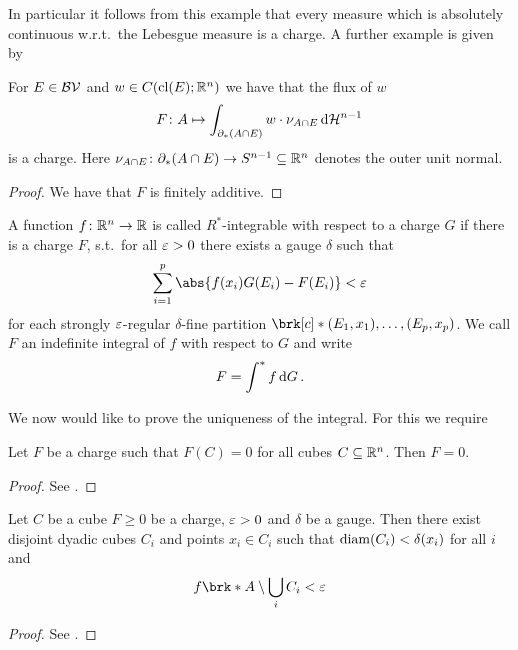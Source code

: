 In particular it follows from this example that every measure which is absolutely continuous w.r.t.\ the Lebesgue measure is a charge.
A further example is given by

\begin{claim}
For $E\in\mathcal{BV}$  and $w\in C(\operatorname{cl}(E);\mathbb{R}^n)$ we have that the flux of $w$
\begin{align*}
	F\colon A\mapsto \int_{\partial_*(A\cap E)}w\cdot\nu_{A\cap E}\,\mathrm{d} \mathcal{H}^{n-1}
\end{align*}
is a charge. Here $\nu_{A\cap E}\colon \partial_*(A\cap E)\to S^{n-1}\subseteq\mathbb{R}^n$ denotes the outer unit normal.
\end{claim}
\begin{proof}
We have that $F$ is finitely additive. 
\end{proof}

\begin{definition}
A function $f\colon \mathbb{R}^n\to\mathbb{R}$ is called $R^*$-integrable with respect to a charge $G$ if there is a charge $F$, s.t.\ for all $\varepsilon>0$ there exists a gauge $\delta$ such that
\begin{align*}
	\sum_{i=1}^p\abs{f(x_i)G(E_i)-F(E_i)}<\e
\end{align*}
for each strongly $\varepsilon$-regular $\delta$-fine partition $\brk[c]*{(E_1,x_1),\dots,(E_p,x_p)}$. We call $F$ an indefinite integral of $f$ with respect to $G$ and write
\begin{align*}
	F=\int^* f\,\mathrm{d} G\,.
\end{align*}
\end{definition}

We now would like to prove the uniqueness of the integral. For this we require
\begin{lemma}\label{le:DensityCubes}
Let $F$ be a charge such that $F(C)=0$ for all cubes $C\subseteq\mathbb{R}^n$. Then $F=0$.
\end{lemma}
\begin{proof}
See \cite[Lemma 2.4]{Pfe2016}.
\end{proof}

\begin{lemma}\label{le:DisjointCube}
Let $C$ be a cube $F\geq0$ be a charge, $\varepsilon>0$ and $\delta$ be a gauge. Then there exist disjoint dyadic cubes $C_i$ and points $x_i\in C_i$ such that $\operatorname{diam}(C_i)<\delta(x_i)$ for all $i$ and
\begin{align*}
	f\brk*{A\setminus\bigcup_iC_i}<\e
\end{align*}
\end{lemma}
\begin{proof}
See \cite[Lemma 2.6.4]{Pfe2001}.
\end{proof}

